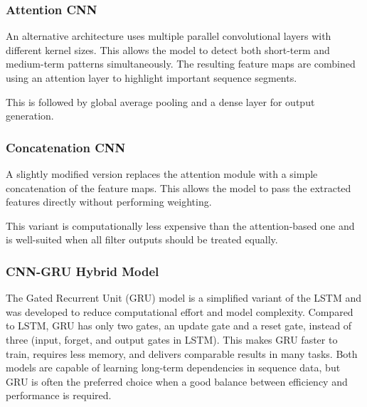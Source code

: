 

\subsubsection{Attention CNN}

An alternative architecture uses multiple parallel convolutional layers with different kernel sizes.
This allows the model to detect both short-term and medium-term patterns simultaneously.
The resulting feature maps are combined using an attention layer to highlight important sequence segments.

This is followed by global average pooling and a dense layer for output generation.



\subsubsection{Concatenation CNN}

A slightly modified version replaces the attention module with a simple concatenation of the feature maps.
This allows the model to pass the extracted features directly without performing weighting.

This variant is computationally less expensive than the attention-based one and is well-suited when all filter outputs should be treated equally.



\subsubsection{CNN-GRU Hybrid Model}

The Gated Recurrent Unit (GRU) model is a simplified variant of the LSTM and was developed to reduce computational effort and model complexity.
Compared to LSTM, GRU has only two gates, an update gate and a reset gate, instead of three (input, forget, and output gates in LSTM).
This makes GRU faster to train, requires less memory, and delivers comparable results in many tasks.
Both models are capable of learning long-term dependencies in sequence data, but GRU is often the preferred choice when a good balance between efficiency and performance is required.

